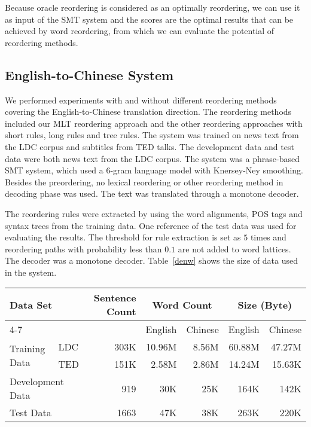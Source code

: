 \documentclass[a4paper]{article}
\begin{document}
Because oracle reordering is considered as an optimally reordering, we can use it as input of the SMT system and the scores are the optimal results that can be achieved by word reordering, from which we can evaluate the potential of reordering methods.


\subsection{English-to-Chinese System}

We performed experiments with and without different reordering methods covering the English-to-Chinese translation direction. The reordering methods included our MLT reordering approach and the other reordering approaches with short rules, long rules and tree rules. The system was trained on news text from the LDC corpus and subtitles from TED talks. The development data and test data were both news text from the LDC corpus. The system was a phrase-based SMT system, which used a $6$-gram language model with Knersey-Ney smoothing. Besides the preordering, no lexical reordering or other reordering method in decoding phase was used. The text was translated through a monotone decoder.

The reordering rules were extracted by using the word alignments, POS tags and syntax trees from the training data. One reference of the test data was used for evaluating the results. The threshold for rule extraction is set as $5$ times and reordering paths with probability less than $0.1$ are not added to word lattices. The decoder was a monotone decoder. Table~\ref{denw} shows the size of data used in the system.

\begin{table*}
\centering
\begin{tabular}{|ll|r|r|r|r|r|}
\hline
\multicolumn{2}{|l|}{\multirow{2}{*}{Data Set}} & \multirow{2}{*}{Sentence Count} & \multicolumn{2}{c|}{Word Count} & \multicolumn{2}{c|}{Size (Byte)}\\ \cline{4-7}
& & & English & Chinese & English & Chinese \\
\hline
\multirow{2}{*}{Training Data} & \multicolumn{1}{|l|}{LDC} & 303K & 10.96M & 8.56M & 60.88M & 47.27M \\ \cline{2-7}
& \multicolumn{1}{|l|}{TED} & 151K & 2.58M & 2.86M & 14.24M & 15.63K \\ \hline
\multicolumn{2}{|l|}{Development Data} & 919 & 30K & 25K & 164K & 142K \\ \hline
\multicolumn{2}{|l|}{Test Data} & 1663 & 47K & 38K & 263K & 220K \\ \hline
\end{tabular}
\caption{Data details in English-to-Chinese system}
\label{denw}
\end{table*}
\end{document}
